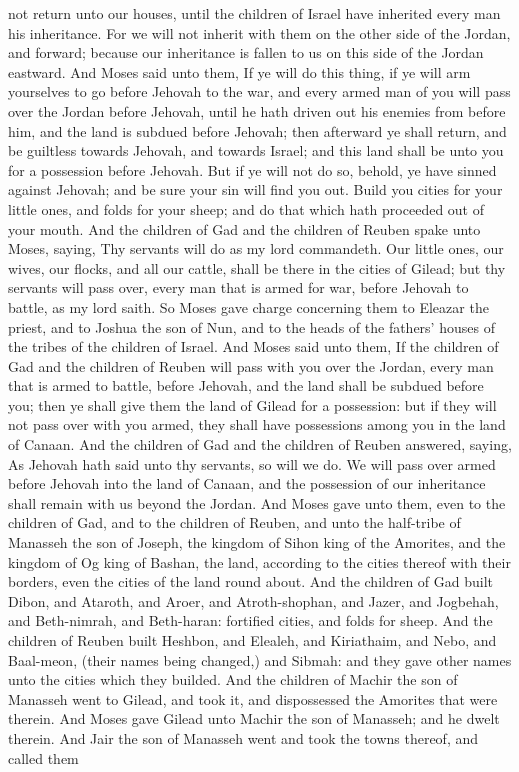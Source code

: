 not return unto our houses, until the children of Israel have inherited every man his inheritance. For we will not inherit with them on the other side of the Jordan, and forward; because our inheritance is fallen to us on this side of the Jordan eastward.  And Moses said unto them, If ye will do this thing, if ye will arm yourselves to go before Jehovah to the war, and every armed man of you will pass over the Jordan before Jehovah, until he hath driven out his enemies from before him, and the land is subdued before Jehovah; then afterward ye shall return, and be guiltless towards Jehovah, and towards Israel; and this land shall be unto you for a possession before Jehovah. But if ye will not do so, behold, ye have sinned against Jehovah; and be sure your sin will find you out. Build you cities for your little ones, and folds for your sheep; and do that which hath proceeded out of your mouth. And the children of Gad and the children of Reuben spake unto Moses, saying, Thy servants will do as my lord commandeth. Our little ones, our wives, our flocks, and all our cattle, shall be there in the cities of Gilead; but thy servants will pass over, every man that is armed for war, before Jehovah to battle, as my lord saith.  So Moses gave charge concerning them to Eleazar the priest, and to Joshua the son of Nun, and to the heads of the fathers’ houses of the tribes of the children of Israel. And Moses said unto them, If the children of Gad and the children of Reuben will pass with you over the Jordan, every man that is armed to battle, before Jehovah, and the land shall be subdued before you; then ye shall give them the land of Gilead for a possession: but if they will not pass over with you armed, they shall have possessions among you in the land of Canaan. And the children of Gad and the children of Reuben answered, saying, As Jehovah hath said unto thy servants, so will we do. We will pass over armed before Jehovah into the land of Canaan, and the possession of our inheritance shall remain with us beyond the Jordan.  And Moses gave unto them, even to the children of Gad, and to the children of Reuben, and unto the half-tribe of Manasseh the son of Joseph, the kingdom of Sihon king of the Amorites, and the kingdom of Og king of Bashan, the land, according to the cities thereof with their borders, even the cities of the land round about. And the children of Gad built Dibon, and Ataroth, and Aroer, and Atroth-shophan, and Jazer, and Jogbehah, and Beth-nimrah, and Beth-haran: fortified cities, and folds for sheep. And the children of Reuben built Heshbon, and Elealeh, and Kiriathaim, and Nebo, and Baal-meon, (their names being changed,) and Sibmah: and they gave other names unto the cities which they builded. And the children of Machir the son of Manasseh went to Gilead, and took it, and dispossessed the Amorites that were therein. And Moses gave Gilead unto Machir the son of Manasseh; and he dwelt therein. And Jair the son of Manasseh went and took the towns thereof, and called them 